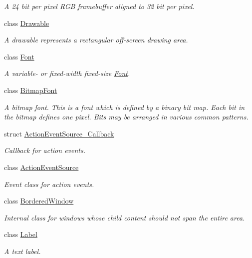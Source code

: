 \begin{DoxyCompactItemize}
\begin{DoxyCompactList}\small\item\em A 24 bit per pixel R\-G\-B framebuffer aligned to 32 bit per pixel. \end{DoxyCompactList}\item 
class \hyperlink{classGUI_1_1Drawable}{Drawable}
\begin{DoxyCompactList}\small\item\em A drawable represents a rectangular off-\/screen drawing area. \end{DoxyCompactList}\item 
class \hyperlink{classGUI_1_1Font}{Font}
\begin{DoxyCompactList}\small\item\em A variable-\/ or fixed-\/width fixed-\/size \hyperlink{classGUI_1_1Font}{Font}. \end{DoxyCompactList}\item 
class \hyperlink{classGUI_1_1BitmapFont}{Bitmap\-Font}
\begin{DoxyCompactList}\small\item\em A bitmap font. This is a font which is defined by a binary bit map. Each bit in the bitmap defines one pixel. Bits may be arranged in various common patterns. \end{DoxyCompactList}\item 
struct \hyperlink{structGUI_1_1ActionEventSource__Callback}{Action\-Event\-Source\-\_\-\-Callback}
\begin{DoxyCompactList}\small\item\em Callback for action events. \end{DoxyCompactList}\item 
class \hyperlink{classGUI_1_1ActionEventSource}{Action\-Event\-Source}
\begin{DoxyCompactList}\small\item\em Event class for action events. \end{DoxyCompactList}\item 
class \hyperlink{classGUI_1_1BorderedWindow}{Bordered\-Window}
\begin{DoxyCompactList}\small\item\em Internal class for windows whose child content should not span the entire area. \end{DoxyCompactList}\item 
class \hyperlink{classGUI_1_1Label}{Label}
\begin{DoxyCompactList}\small\item\em A text label. \end{DoxyCompactList}\item 

\end{DoxyCompactItemize}

